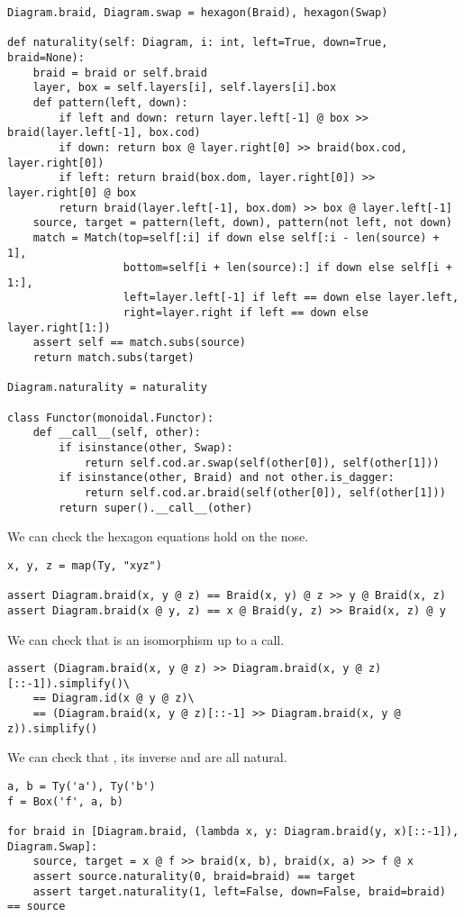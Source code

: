 \begin{python}
\begin{verbatim}
Diagram.braid, Diagram.swap = hexagon(Braid), hexagon(Swap)

def naturality(self: Diagram, i: int, left=True, down=True, braid=None):
    braid = braid or self.braid
    layer, box = self.layers[i], self.layers[i].box
    def pattern(left, down):
        if left and down: return layer.left[-1] @ box >> braid(layer.left[-1], box.cod)
        if down: return box @ layer.right[0] >> braid(box.cod, layer.right[0])
        if left: return braid(box.dom, layer.right[0]) >> layer.right[0] @ box
        return braid(layer.left[-1], box.dom) >> box @ layer.left[-1]
    source, target = pattern(left, down), pattern(not left, not down)
    match = Match(top=self[:i] if down else self[:i - len(source) + 1],
                  bottom=self[i + len(source):] if down else self[i + 1:],
                  left=layer.left[-1] if left == down else layer.left,
                  right=layer.right if left == down else layer.right[1:])
    assert self == match.subs(source)
    return match.subs(target)

Diagram.naturality = naturality

class Functor(monoidal.Functor):
    def __call__(self, other):
        if isinstance(other, Swap):
            return self.cod.ar.swap(self(other[0]), self(other[1]))
        if isinstance(other, Braid) and not other.is_dagger:
            return self.cod.ar.braid(self(other[0]), self(other[1]))
        return super().__call__(other)
\end{verbatim}
\end{python}

\begin{example}
We can check the hexagon equations hold on the nose.

\begin{verbatim}
x, y, z = map(Ty, "xyz")

assert Diagram.braid(x, y @ z) == Braid(x, y) @ z >> y @ Braid(x, z)
assert Diagram.braid(x @ y, z) == x @ Braid(y, z) >> Braid(x, z) @ y
\end{verbatim}

We can check that  is an isomorphism up to a  call.

\begin{verbatim}
assert (Diagram.braid(x, y @ z) >> Diagram.braid(x, y @ z)[::-1]).simplify()\
    == Diagram.id(x @ y @ z)\
    == (Diagram.braid(x, y @ z)[::-1] >> Diagram.braid(x, y @ z)).simplify()
\end{verbatim}

We can check that , its inverse and  are all natural.

\begin{verbatim}
a, b = Ty('a'), Ty('b')
f = Box('f', a, b)

for braid in [Diagram.braid, (lambda x, y: Diagram.braid(y, x)[::-1]), Diagram.Swap]:
    source, target = x @ f >> braid(x, b), braid(x, a) >> f @ x
    assert source.naturality(0, braid=braid) == target
    assert target.naturality(1, left=False, down=False, braid=braid) == source
\end{verbatim}
\end{example}

